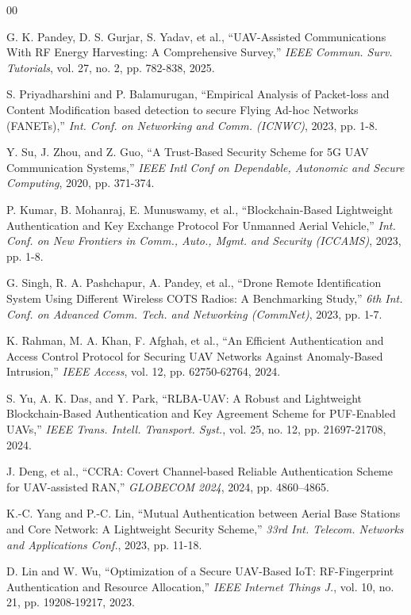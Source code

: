 \documentclass[preprint,12pt]{elsarticle}
\begin{document}
\begin{thebibliography}{00}

 G. K. Pandey, D. S. Gurjar, S. Yadav, et al., ``UAV-Assisted Communications With RF Energy Harvesting: A Comprehensive Survey,'' \textit{IEEE Commun. Surv. Tutorials}, vol. 27, no. 2, pp. 782-838, 2025.

 S. Priyadharshini and P. Balamurugan, ``Empirical Analysis of Packet-loss and Content Modification based detection to secure Flying Ad-hoc Networks (FANETs),'' \textit{Int. Conf. on Networking and Comm. (ICNWC)}, 2023, pp. 1-8.

 Y. Su, J. Zhou, and Z. Guo, ``A Trust-Based Security Scheme for 5G UAV Communication Systems,'' \textit{IEEE Intl Conf on Dependable, Autonomic and Secure Computing}, 2020, pp. 371-374.

 P. Kumar, B. Mohanraj, E. Munuswamy, et al., ``Blockchain-Based Lightweight Authentication and Key Exchange Protocol For Unmanned Aerial Vehicle,'' \textit{Int. Conf. on New Frontiers in Comm., Auto., Mgmt. and Security (ICCAMS)}, 2023, pp. 1-8.

 G. Singh, R. A. Pashchapur, A. Pandey, et al., ``Drone Remote Identification System Using Different Wireless COTS Radios: A Benchmarking Study,'' \textit{6th Int. Conf. on Advanced Comm. Tech. and Networking (CommNet)}, 2023, pp. 1-7.

 K. Rahman, M. A. Khan, F. Afghah, et al., ``An Efficient Authentication and Access Control Protocol for Securing UAV Networks Against Anomaly-Based Intrusion,'' \textit{IEEE Access}, vol. 12, pp. 62750-62764, 2024.

 S. Yu, A. K. Das, and Y. Park, ``RLBA-UAV: A Robust and Lightweight Blockchain-Based Authentication and Key Agreement Scheme for PUF-Enabled UAVs,'' \textit{IEEE Trans. Intell. Transport. Syst.}, vol. 25, no. 12, pp. 21697-21708, 2024.

 J. Deng, et al., ``CCRA: Covert Channel-based Reliable Authentication Scheme for UAV-assisted RAN,'' \textit{GLOBECOM 2024}, 2024, pp. 4860--4865.

 K.-C. Yang and P.-C. Lin, ``Mutual Authentication between Aerial Base Stations and Core Network: A Lightweight Security Scheme,'' \textit{33rd Int. Telecom. Networks and Applications Conf.}, 2023, pp. 11-18.

 D. Lin and W. Wu, ``Optimization of a Secure UAV-Based IoT: RF-Fingerprint Authentication and Resource Allocation,'' \textit{IEEE Internet Things J.}, vol. 10, no. 21, pp. 19208-19217, 2023.


\end{thebibliography}
\end{document}
